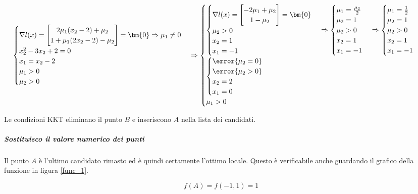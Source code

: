 \documentclass[\main/main.tex]{subfiles}
\begin{document}
\[
  \begin{cases}
    \nabla l(x) = \begin{bmatrix}
      2\mu_1(x_2 - 2) + \mu_2 \\
      1 + \mu_1 (2x_2 - 2) - \mu_2
    \end{bmatrix}
    = \bm{0}  \Rightarrow \mu_1 \neq 0 \\
    x_2^2  -3x_2 + 2 = 0               \\
    x_1 = x_2 - 2                      \\
    \mu_1 > 0                          \\
    \mu_2 > 0
  \end{cases}
  \Rightarrow
  \begin{cases}
    \begin{cases}
      \nabla l(x) = \begin{bmatrix}
        -2\mu_1 + \mu_2 \\
        1 - \mu_2
      \end{bmatrix}
      = \bm{0}  \\
      \mu_2 > 0 \\
      x_2 = 1   \\
      x_1 = -1
    \end{cases}
    \Rightarrow
    \begin{cases}
      \mu_1 = \frac{\mu_2}{2}     \\
      \mu_2 = 1 \\
      \mu_2 > 0                   \\
      x_2 = 1                     \\
      x_1 = -1
    \end{cases}
    \Rightarrow
    \begin{cases}
      \mu_1 = \frac{1}{2} \\
      \mu_2 = 1 \\
      \mu_2 > 0           \\
      x_2 = 1             \\
      x_1 = -1
    \end{cases}
    \\
    \begin{cases}
      \error{\mu_2 = 0} \\
      \error{\mu_2 > 0} \\
      x_2 = 2           \\
      x_1 = 0
    \end{cases} \\
    \mu_1 > 0                  \\
  \end{cases}
\]

Le condizioni KKT eliminano il punto $B$ e inseriscono $A$ nella lista dei candidati.

\subparagraph*{Sostituisco il valore numerico dei punti}
Il punto $A$ è l'ultimo candidato rimasto ed è quindi certamente l'ottimo locale. Questo è verificabile anche guardando il grafico della funzione in figura \ref{func_1}.

\[
  f(A) = f(-1, 1) = 1
\]
\end{document}
